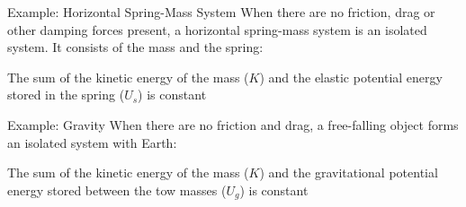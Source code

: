 \documentclass[12pt,compress,aspectratio=169]{beamer}
\begin{document}
\begin{frame}{Example: Horizontal Spring-Mass System}
  When there are no friction, drag or other damping forces present, a
  horizontal spring-mass system is an isolated system. It consists of the
  mass and the spring:
  \begin{center}
  \end{center}
  The sum of the kinetic energy of the mass ($K$) and the elastic potential
  energy stored in the spring ($U_s$) is constant

\end{frame}



\begin{frame}{Example: Gravity}
  When there are no friction and drag, a free-falling object forms an isolated
  system with Earth:
  \begin{center}
  \end{center}
  The sum of the kinetic energy of the mass ($K$) and the gravitational
  potential energy stored between the tow masses ($U_g$) is constant
    
\end{frame}
\end{document}
